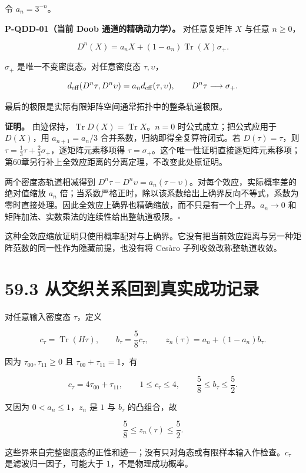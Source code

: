 \documentclass[
  11pt,
  oneside]{book}
\begin{document}
令 \(a_n=3^{-n}\)。

\protect\hypertarget{p-qdd-01}{}{}

\textbf{P-QDD-01（当前 Doob 通道的精确动力学）。} 对任意复矩阵 \(X\)
与任意 \(n\ge0\)，

\[
D^n(X)=a_nX+(1-a_n)\operatorname{Tr}(X)\sigma_+.
\]

\(\sigma_+\) 是唯一不变密度态。对任意密度态 \(\tau,\upsilon\)，

\[
d_{\rm eff}(D^n\tau,D^n\upsilon)
=a_n d_{\rm eff}(\tau,\upsilon),
\qquad D^n\tau\longrightarrow\sigma_+.
\]

最后的极限是实际有限矩阵空间通常拓扑中的整条轨道极限。

\textbf{证明。}
由迹保持，\(\operatorname{Tr}D(X)=\operatorname{Tr}X\)。\(n=0\)
时公式成立；把公式应用于 \(D(X)\)，用 \(a_{n+1}=a_n/3\)
合并系数，归纳即得全复算符闭式。若 \(D(\tau)=\tau\)，则
\(\tau=\frac13\tau+\frac23\sigma_+\)，逐矩阵元素移项得
\(\tau=\sigma_+\)。这个唯一性证明直接逐矩阵元素移项；第60章另行补上全效应距离的分离定理，不改变此处原证明。

两个密度态轨道相减得到
\(D^n\tau-D^n\upsilon=a_n(\tau-\upsilon)\)。对每个效应，实际概率差的绝对值缩放
\(a_n\)
倍；当系数严格正时，除以该系数给出上确界反向不等式，系数为零时直接处理。因此全效应上确界也精确缩放，而不只是有一个上界。\(a_n\to0\)
和矩阵加法、实数乘法的连续性给出整轨道极限。\(\square\)

这种全效应缩放证明只使用概率配对与上确界。它没有把当前效应距离与另一种矩阵范数的同一性作为隐藏前提，也没有将
Cesàro 子列收敛改称整轨道收敛。

\section{59.3 从交织关系回到真实成功记录}

对任意输入密度态 \(\tau\)，定义

\[
c_\tau=\operatorname{Tr}(H\tau),\qquad
b_\tau=\frac58c_\tau,\qquad
z_n(\tau)=a_n+(1-a_n)b_\tau.
\]

因为 \(\tau_{00},\tau_{11}\ge0\) 且 \(\tau_{00}+\tau_{11}=1\)，有

\[
c_\tau=4\tau_{00}+\tau_{11},\qquad
1\le c_\tau\le4,\qquad
\frac58\le b_\tau\le\frac52.
\]

又因为 \(0<a_n\le1\)，\(z_n\) 是 \(1\) 与 \(b_\tau\) 的凸组合，故

\[
\frac58\le z_n(\tau)\le\frac52.
\]

这些界来自完整密度态的正性和迹一；没有只对角态或有限样本输入作检查。\(c_\tau\)
是滤波归一因子，可能大于 \(1\)，不是物理成功概率。
\end{document}
